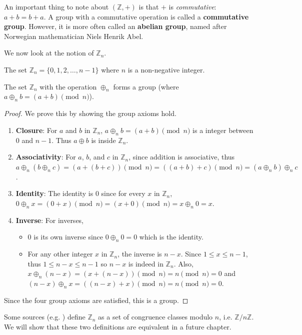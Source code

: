 An important thing to note about $(\mathbb{Z}, +)$ is that $+$ is \textit{commutative}: $a + b = b + a$. A group with a commutative operation is called a \textbf{commutative group}. However, it is more often called an \textbf{abelian group}, named after Norwegian mathematician Niels Henrik Abel.

We now look at the notion of $\mathbb{Z}_n$.
\begin{definition}
    The set $\mathbb{Z}_n = \{0, 1, 2, \dots, n-1\}$ where $n$ is a non-negative integer.
\end{definition}
\begin{proposition}
    The set $\mathbb{Z}_n$ with the operation $\oplus_n$ forms a group (where $a \oplus_n b = (a + b) \pmod{n}$).
\end{proposition}
\begin{proof}
    We prove this by showing the group axioms hold.
    \begin{enumerate}
        \item \textbf{Closure}: For $a$ and $b$ in $\mathbb{Z}_n$, $a \oplus_n b = (a + b) \pmod{n}$ is a integer between 0 and $n - 1$. Thus $a \oplus b$ is inside $\mathbb{Z}_n$.
        \item \textbf{Associativity}: For $a$, $b$, and $c$ in $\mathbb{Z}_n$, since addition is associative, thus $a \oplus_n (b \oplus_n c) = (a + (b + c)) \pmod{n} = ((a + b) + c) \pmod{n} = (a \oplus_n b) \oplus_n c$.
        \item \textbf{Identity}: The identity is $0$ since for every $x$ in $\mathbb{Z}_n$, $0 \oplus_n x = (0 + x) \pmod{n} = (x + 0) \pmod{n} = x \oplus_n 0 = x$.
        \item \textbf{Inverse}: For inverses, \begin{itemize}
            \item $0$ is its own inverse since $0 \oplus_n 0 = 0$ which is the identity.
            \item For any other integer $x$ in $\mathbb{Z}_n$, the inverse is $n - x$. Since $1 \leq x \leq n - 1$, thus $1 \leq n - x \leq n - 1$ so $n - x$ is indeed in $\mathbb{Z}_n$. Also, $x \oplus_n (n - x) = (x + (n - x)) \pmod{n} = n \pmod{n} = 0$ and $(n - x) \oplus_n x = ((n-x) + x)\pmod{n} = n \pmod{n} = 0$.
        \end{itemize}
    \end{enumerate}
    Since the four group axioms are satisfied, this is a group.
\end{proof}
\begin{remark}
    Some sources (e.g. \cite{clark_1984, humphreys_1996}) define $\mathbb{Z}_n$ as a set of congruence classes modulo $n$, i.e. $\mathbb{Z}/n\mathbb{Z}$. We will show that these two definitions are equivalent in a future chapter.
\end{remark}

